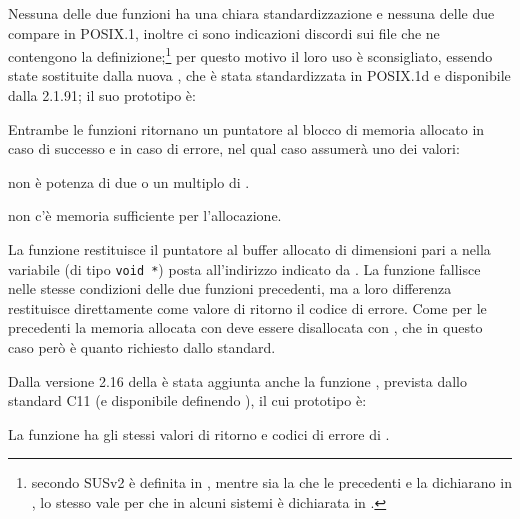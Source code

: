 Nessuna delle due funzioni ha una chiara standardizzazione e nessuna delle due
compare in POSIX.1, inoltre ci sono indicazioni discordi sui file che ne
contengono la definizione;\footnote{secondo SUSv2  è definita in
  , mentre sia la  che le precedenti 
  e  la dichiarano in , lo stesso vale per
   che in alcuni sistemi è dichiarata in .}
per questo motivo il loro uso è sconsigliato, essendo state sostituite dalla
nuova , che è stata standardizzata in POSIX.1d e
disponibile dalla  2.1.91; il suo prototipo è:

\begin{funcproto}{ 
}
{Entrambe le funzioni ritornano un puntatore al blocco di memoria allocato in
  caso di successo e  in caso di errore, nel qual caso 
  assumerà uno dei valori:
  \begin{errlist}
  \item[\errcode{EINVAL}]  non è potenza di due o un multiplo
    di .
  \item[\errcode{ENOMEM}] non c'è memoria sufficiente per l'allocazione.
  \end{errlist}}
\end{funcproto}

La funzione restituisce il puntatore al buffer allocato di dimensioni pari
a  nella variabile (di tipo \texttt{void *}) posta all'indirizzo
indicato da . La funzione fallisce nelle stesse condizioni delle
due funzioni precedenti, ma a loro differenza restituisce direttamente come
valore di ritorno il codice di errore.  Come per le precedenti la memoria
allocata con  deve essere disallocata con ,
che in questo caso però è quanto richiesto dallo standard.

Dalla versione 2.16 della  è stata aggiunta anche la funzione
, prevista dallo standard C11 (e disponibile definendo
), il cui prototipo è:

\begin{funcproto}{ 
}
{La funzione ha gli stessi valori di ritorno e codici di errore di
  .}
\end{funcproto}


